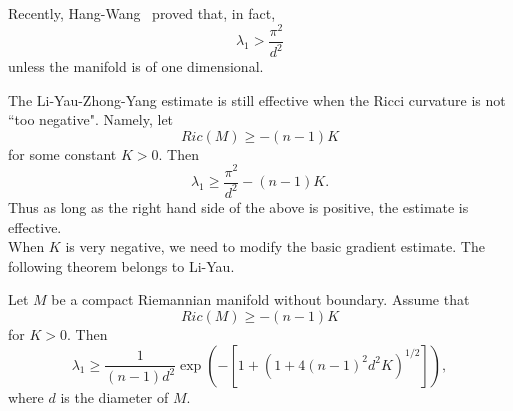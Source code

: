 \begin{remark}
Recently, Hang-Wang~\cite{hang-wang} proved that, in fact,
\[
\lambda_1 > \frac{\pi^2}{d^2}
\]
unless the manifold is of one dimensional.
\end{remark}

The Li-Yau-Zhong-Yang estimate is still effective when the Ricci curvature is
not ``too negative". Namely, let
\[
Ric(M) \geqslant -(n-1)K
\]
for some constant $K>0$.
Then
\[
\lambda_1 \geqslant \frac{\pi^2}{d^2} - (n-1)K.
\]
Thus as long as the right hand side of the above is positive, the estimate is
effective.
\\

When $K$ is very negative, we need to modify the basic gradient estimate. The
following theorem belongs to Li-Yau.
\begin{theorem}
Let $M$ be a compact Riemannian manifold without boundary. Assume that
\[
Ric(M) \geqslant -(n-1)K
\]
for $K>0$. Then
\[
\lambda_1 \geqslant \frac{1}{(n-1)d^2}\exp(-[1 + (1 + 4(n-1)^2 d^2 K)^{1/2}]),
\]
where $d$ is the diameter of $M$.
\end{theorem}

